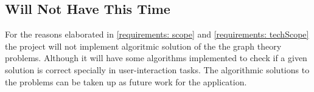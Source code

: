 \subsection{Will Not Have This Time}
\label{requirements: willnothave}
For the reasons elaborated in \autoref{requirements: scope} and
\autoref{requirements: techScope} the project will not implement algoritmic
solution of the the graph theory problems.  Although it will have some
algorithms implemented to check if a given solution is correct specially in
user-interaction tasks.  The algorithmic solutions to the problems can be taken
up as future work for the application.
